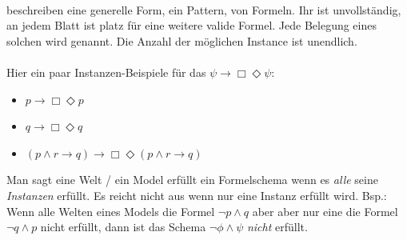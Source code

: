 \paragraph{\formelSchemata} %
\label{par:formel_schemata}
\formelSchemata beschreiben eine generelle Form, ein Pattern, von Formeln.
Ihr \parseTree ist unvollständig, an jedem Blatt ist platz für eine weitere valide \ML Formel.
Jede Belegung eines solchen \formelSchema wird  genannt.
Die Anzahl der möglichen Instance ist unendlich.\\
\\
Hier ein paar Instanzen-Beispiele für das \formelSchema $\psi \rightarrow \Box \Diamond \psi$:\\
\begin{itemize}
	\item $p \rightarrow \Box \Diamond p$
	\item $q \rightarrow \Box \Diamond q$
	\item $(p \wedge r \rightarrow q) \rightarrow \Box \Diamond (p \wedge r \rightarrow q)$
\end{itemize}
%
%
Man sagt eine Welt / ein Model erfüllt ein Formelschema wenn es \emph{alle} seine \emph{Instanzen} erfüllt. 
Es reicht nicht aus wenn nur eine Instanz erfüllt wird. 
Bsp.: Wenn alle Welten eines Models die Formel $\neg p \wedge q$ aber aber nur eine die Formel $\neg q \wedge p$ nicht erfüllt, dann ist das Schema $\neg \phi \wedge \psi$ \emph{nicht} erfüllt.



